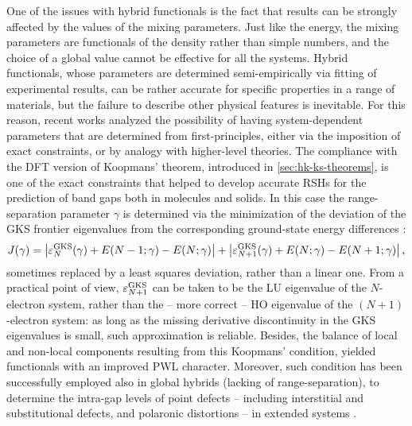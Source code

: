 One of the issues with hybrid functionals is the fact that results can be strongly affected by the values of the mixing parameters. Just like the energy, the mixing parameters are functionals of the density rather than simple numbers, and the choice of a global value cannot be effective for all the systems. Hybrid functionals, whose parameters are determined semi-empirically via fitting of experimental results, can be rather accurate for specific properties in a range of materials, but the failure to describe other physical features is inevitable. For this reason, recent works analyzed the possibility of having system-dependent parameters that are determined from first-principles, either via the imposition of exact constraints, or by analogy with higher-level theories. The compliance with the DFT version of Koopmans' theorem, introduced in \cref{sec:hk-ks-theorems}, is one of the exact constraints that helped to develop accurate RSHs for the prediction of band gaps both in molecules and solids. In this case the range-separation parameter $\gamma$ is determined via the minimization of the deviation of the GKS frontier eigenvalues from the corresponding ground-state energy differences \cite{stein_fundamental_2010,refaely-abramson_quasiparticle_2012}:
%
\begin{equation}
    J(\gamma) = \left| \varepsilon_N^{\rm GKS}(\gamma) + E(N-1;\gamma) - E(N;\gamma) \right| + \left| \varepsilon_{N+1}^{\rm GKS}(\gamma) + E(N;\gamma) - E(N+1;\gamma) \right| ,
    \label{eq:kc-condition-hybrids}
\end{equation}
%
sometimes replaced by a least squares deviation, rather than a linear one. From a practical point of view, $\varepsilon_{N+1}^{\rm GKS}$ can be taken to be the LU eigenvalue of the $N$-electron system, rather than the -- more correct -- HO eigenvalue of the $(N+1)$-electron system: as long as the missing derivative discontinuity in the GKS eigenvalues is small, such approximation is reliable. Besides, the balance of local and non-local components resulting from this Koopmans' condition, yielded functionals with an improved PWL character. Moreover, such condition has been successfully employed also in global hybrids (lacking of range-separation), to determine the intra-gap levels of point defects -- including interstitial and substitutional defects, and polaronic distortions -- in extended systems \cite{miceli_nonempirical_2018,bischoff_adjustable_2019}.

